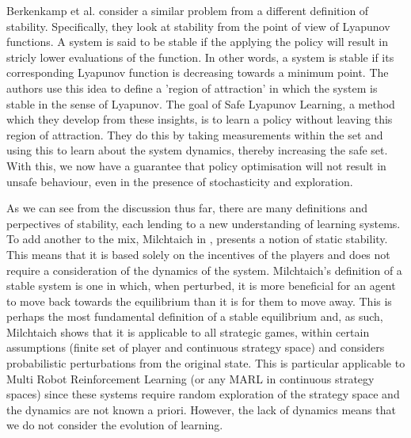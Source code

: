 \documentclass[../sample.tex]{subfiles}
\begin{document}
Berkenkamp et al. \cite{Berkenkamp2017SafeGuarantees} consider a similar problem from a different
definition of stability. Specifically, they look at stability from the point of view of Lyapunov
functions. A system is said to be stable if the applying the policy will result in stricly lower
evaluations of the function. In other words, a system is stable if its corresponding Lyapunov
function is decreasing towards a minimum point. The authors use this idea to define a 'region of
attraction' in which the system is stable in the sense of Lyapunov. The goal of Safe Lyapunov
Learning, a method which they develop from these insights, is to learn a policy without leaving this
region of attraction. They do this by taking measurements within the set and using this to learn
about the system dynamics, thereby increasing the safe set. With this, we now have a guarantee that
policy optimisation will not result in unsafe behaviour, even in the presence of stochasticity and
exploration.

As we can see from the discussion thus far, there are many definitions and perpectives of stability,
each lending to a new understanding of learning systems. To add another to the mix, Milchtaich in
\cite{Milchtaich2007StaticGames}, presents a notion of static stability. This means that it is based
solely on the incentives of the players and does not require a consideration of the dynamics of the
system. Milchtaich's definition of a stable system is one in which, when perturbed, it is more
beneficial for an agent to move back towards the equilibrium than it is for them to move away. This
is perhaps the most fundamental definition of a stable equilibrium and, as such, Milchtaich shows
that it is applicable to all strategic games, within certain assumptions (finite set of player and
continuous strategy space) and considers probabilistic perturbations from the original state. This
is particular applicable to Multi Robot Reinforcement Learning (or any MARL in continuous strategy
spaces) since these systems require random exploration of the strategy space and the dynamics are
not known a priori. However, the lack of dynamics means that we do not consider the evolution of
learning.


\end{document}
